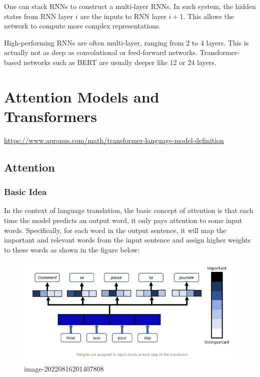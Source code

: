 \documentclass[
]{book}
\begin{document}
One can stack RNNs to construct a multi-layer RNNs. In such system, the hidden states from RNN layer \(i\) are the inputs to RNN layer \(i+1\). This allows the network to compute more complex representations.

High-performing RNNs are often multi-layer, ranging from 2 to 4 layers. This is actually not as deep as convolutional or feed-forward networks. Transformer-based networks such as BERT are usually deeper like 12 or 24 layers.

\hypertarget{attention-models-and-transformers}{%
\chapter{Attention Models and Transformers}\label{attention-models-and-transformers}}

\url{https://www.apronus.com/math/transformer-language-model-definition}

\hypertarget{attention}{%
\section{Attention}\label{attention}}

\hypertarget{basic-idea}{%
\subsection{Basic Idea}\label{basic-idea}}

In the context of language translation, the basic concept of attention is that each time the model predicts an output word, it only pays attention to some input words. Specifically, for each word in the output sentence, it will map the important and relevant words from the input sentence and assign higher weights to these words as shown in the figure below:

\begin{figure}
\centering
\includegraphics{Figures/transformers_01.png}
\caption{image-20220816201407808}
\end{figure}
\end{document}
